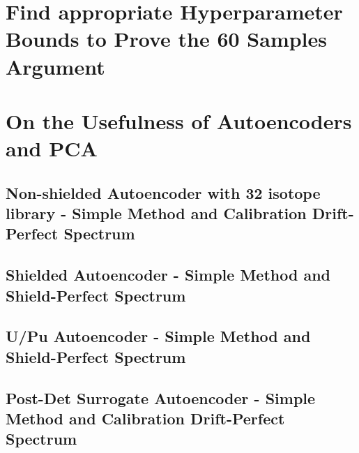 \documentclass[thesis,tocnosub,noragright,centerchapter,12pt,fullpage]{uiucecethesis09}
\begin{document}
\section{Find appropriate Hyperparameter Bounds to Prove the 60 Samples Argument}

\section{On the Usefulness of Autoencoders and PCA}

\subsection{Non-shielded Autoencoder with 32 isotope library - Simple Method and Calibration Drift-Perfect Spectrum}

\subsection{Shielded Autoencoder - Simple Method and Shield-Perfect Spectrum}

\subsection{U/Pu Autoencoder - Simple Method and Shield-Perfect Spectrum}

\subsection{Post-Det Surrogate Autoencoder - Simple Method and Calibration Drift-Perfect Spectrum}
\end{document}
